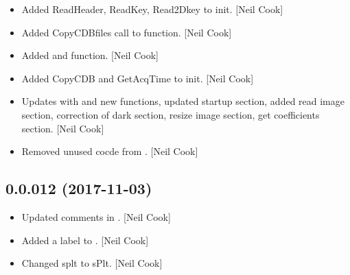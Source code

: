 \documentclass[a4paper,10pt,english]{report}
\begin{document}
\begin{itemize}
\item {} 
Added ReadHeader, ReadKey, Read2Dkey to init. {[}Neil Cook{]}

\item {} 
Added CopyCDBfiles call to  function. {[}Neil Cook{]}

\item {} 
Added  and  function. {[}Neil Cook{]}

\item {} 
Added CopyCDB and GetAcqTime to init. {[}Neil Cook{]}

\item {} 
Updates  with  and new functions, updated startup
section, added read image section, correction of dark section, resize
image section, get coefficients section. {[}Neil Cook{]}

\item {} 
Removed unused cocde from . {[}Neil Cook{]}

\end{itemize}


\subsection{0.0.012 (2017-11-03)}
\label{\detokenize{misc/changelog:id539}}\begin{itemize}
\item {} 
Updated comments in . {[}Neil Cook{]}

\item {} 
Added a label to . {[}Neil Cook{]}

\item {} 
Changed splt to sPlt. {[}Neil Cook{]}

\end{itemize}
\end{document}
